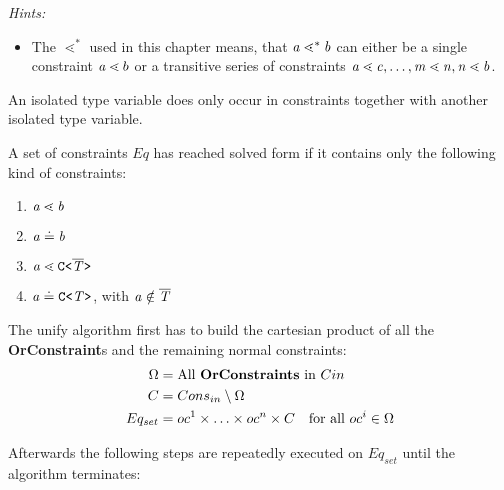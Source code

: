 \textit{Hints:}
\begin{itemize}
\item The $\lessdot^*$ used in this chapter means,
that $\mathit{ a } \lessdot^* \mathit{ b }$ can either be a single constraint $\mathit{ a } \lessdot b$ or a transitive series of constraints
$\mathit{ a } \lessdot \mathit{ c }, \ldots, \mathit{ m } \lessdot \mathit{ n }, \mathit{ n } \lessdot \mathit{ b }$.
\end{itemize}
\begin{definition} \label{def:isolated-type-variable}
    \textrm
  An isolated type variable does only occur in constraints together with another isolated type variable.
  \end{definition}
  
  \begin{definition}\label{def:solved-form}
    \textrm
    A set of constraints $Eq$ has reached solved form if it contains only the following kind of constraints:
    \begin{enumerate}
      \item $\mathit{ a } \lessdot \mathit{ b }$ %
      \item $\mathit{ a } \doteq \mathit{ b }$
      \item $\mathit{ a } \lessdot \mathtt{C \texttt{<} \overline{\tt \mathit{T}} \texttt{>} }$ %
      \item $\mathit{ a } \doteq \mathtt{C \texttt{<} \mathit{T} \texttt{>} }$, with $\mathit{ a } \notin \overline{\tt \mathit{T}}$
    \end{enumerate}
  \end{definition}  

The unify algorithm first has to build the cartesian product of all the \textbf{OrConstraint}s and the remaining normal constraints:
\begin{align*}
\Omega &= \text{All }\mathbf{OrConstraints} \text{ in } C{in}\\
C &= {Cons}_{in} \setminus \Omega \\
Eq_{set} &= oc^1 \times \ldots \times oc^n \times C \quad \text{for all }oc^i \in \Omega
\end{align*}

Afterwards the following steps are repeatedly executed on $Eq_{set}$ until the algorithm terminates:

